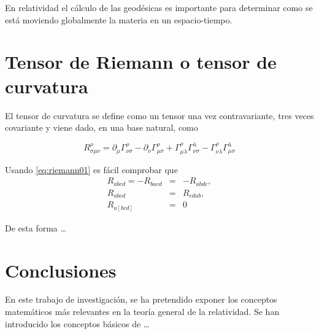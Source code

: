 \documentclass[a4paper,10pt]{article}
\begin{document}
En relatividad el cálculo de las geodésicas es importante para determinar como
se está moviendo globalmente la materia en un espacio-tiempo.

\section{Tensor de Riemann o tensor de curvatura}
El tensor de curvatura se define como un tensor una vez contravariante, tres
veces covariante y viene dado, en una base natural, como

\begin{equation}
\label{eq:riemann01}
R^\rho_{\sigma \mu \nu } = \partial_\mu \Gamma^\rho_{\nu \sigma} - \partial_\nu \Gamma^\rho_{\mu \sigma} + \Gamma^\rho_{\mu \lambda} \Gamma^\lambda_{\nu \sigma} - \Gamma^\rho_{\nu \lambda} \Gamma^\lambda_{\mu \sigma}
\end{equation}

Usando \eqref{eq:riemann01} es fácil comprobar que
\begin{eqnarray*}
R_{abcd} = -R_{bacd} &=& -R_{abdc} , \\
            R_{abcd} &=& R_{cdab} , \\
            R_{a\left[bcd\right]} &=& 0
\end{eqnarray*}

De esta forma \dots

\section{Conclusiones}
En este trabajo de investigación, se ha pretendido exponer los conceptos
matemáticos más relevantes en la teoría general de la relatividad. Se han
introducido los conceptos básicos de \dots
\end{document}
